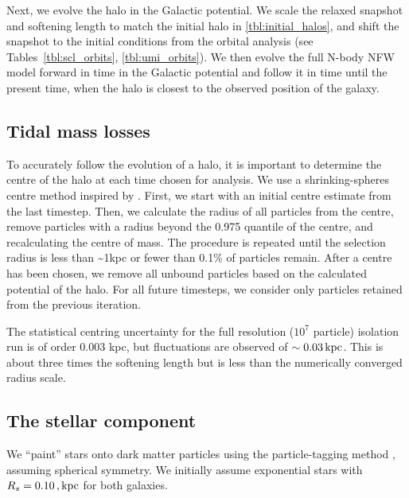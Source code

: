 Next, we evolve the halo in the Galactic potential. We scale the relaxed
snapshot and softening length to match the initial halo in
\ref{tbl:initial_halos}, and shift the snapshot to the initial
conditions from the orbital analysis (see
Tables~\ref{tbl:scl_orbits}, \ref{tbl:umi_orbits}). We then evolve the
full N-body NFW model forward in time in the Galactic potential and
follow it in time until the present time, when the halo is closest to
the observed position of the galaxy.

\subsection{Tidal mass losses}\label{sec:shrinking_spheres}

To accurately follow the evolution of a halo, it is important to
determine the centre of the halo at each time chosen for analysis. We
use a shrinking-spheres centre method inspired by \citet{power+2003}.
First, we start with an initial centre estimate from the last timestep.
Then, we calculate the radius of all particles from the centre, remove
particles with a radius beyond the 0.975 quantile of the centre, and
recalculating the centre of mass. The procedure is repeated until the
selection radius is less than \textasciitilde1kpc or fewer than 0.1\% of
particles remain. After a centre has been chosen, we remove all unbound
particles based on the \gadget{} calculated potential of the halo. For
all future timesteps, we consider only particles retained from the
previous iteration.

The statistical centring uncertainty for the full resolution (\(10^7\)
particle) isolation run is of order 0.003 kpc, but fluctuations are
observed of \(\sim 0.03\,{\rm kpc}\). This is about three times the softening
length but is less than the numerically converged radius scale.

\subsection{The stellar component}\label{sec:painting_stars}

We ``paint'' stars onto dark matter particles using the particle-tagging
method \citep[e.g.][]{bullock+johnston2005}, assuming spherical
symmetry. We initially assume exponential stars with
\(R_s = 0.10\,,{\rm kpc}\) for both galaxies.

